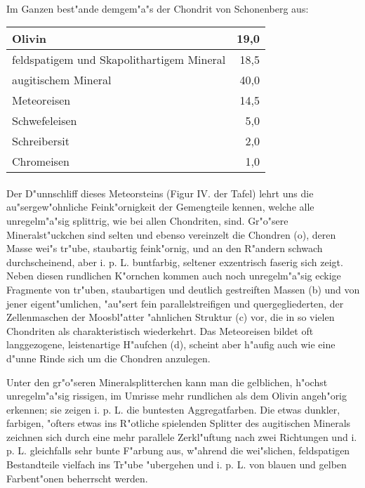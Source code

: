 \documentclass[a4paper, 11pt, oneside]{article}
\begin{document}
\paragraph{}
Im Ganzen best"ande demgem"a"s der Chondrit von Schonenberg aus:
\begin{center}
    \begin{tabular}{ |l|r| } 
    \hline
    Olivin & 19,0\\\hline
    feldspatigem und Skapolithartigem Mineral & 18,5\\\hline
    augitischem Mineral & 40,0\\\hline
    Meteoreisen & 14,5\\\hline
    Schwefeleisen & 5,0\\\hline
    Schreibersit & 2,0\\\hline
    Chromeisen & 1,0\\
    \hline
    \end{tabular}
\end{center}
\paragraph{}
Der D"unnschliff dieses Meteorsteins (Figur IV. der Tafel) lehrt uns die au"sergew"ohnliche Feink"ornigkeit der Gemengteile kennen, welche alle unregelm"a"sig splittrig, wie bei allen Chondriten, sind. Gr"o"sere Mineralst"uckchen sind selten und ebenso vereinzelt die Chondren (o), deren Masse wei"s tr"ube, staubartig feink"ornig, und an den R"andern schwach durchscheinend, aber i. p. L. buntfarbig, seltener exzentrisch faserig sich zeigt. Neben diesen rundlichen K"ornchen kommen auch noch unregelm"a"sig eckige Fragmente von tr"uben, staubartigen und deutlich gestreiften Massen (b) und von jener eigent"umlichen, "au"sert fein parallelstreifigen und quergegliederten, der Zellenmaschen der Moosbl"atter "ahnlichen Struktur (c) vor, die in so vielen Chondriten als charakteristisch wiederkehrt. Das Meteoreisen bildet oft langgezogene, leistenartige H"aufchen (d), scheint aber h"aufig auch wie eine d"unne Rinde sich um die Chondren anzulegen.

Unter den gr"o"seren Mineralsplitterchen kann man die gelblichen, h"ochst unregelm"a"sig rissigen, im Umrisse mehr rundlichen als dem Olivin angeh"orig erkennen; sie zeigen i. p. L. die buntesten Aggregatfarben. Die etwas dunkler, farbigen, "ofters etwas ins R"otliche spielenden Splitter des augitischen Minerals zeichnen sich durch eine mehr parallele Zerkl"uftung nach zwei Richtungen und i. p. L. gleichfalls sehr bunte F"arbung aus, w"ahrend die wei"slichen, feldspatigen Bestandteile vielfach ins Tr"ube "ubergehen und i. p. L. von blauen und gelben Farbent"onen beherrscht werden.
\end{document}
